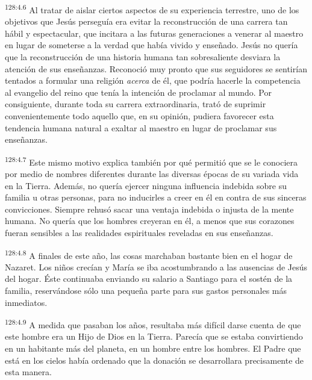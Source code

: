 \par
\textsuperscript{128:4.6} Al tratar de aislar ciertos aspectos de su experiencia terrestre, uno de los objetivos que Jesús perseguía era evitar la reconstrucción de una carrera tan hábil y espectacular, que incitara a las futuras generaciones a venerar al maestro en lugar de someterse a la verdad que había vivido y enseñado. Jesús no quería que la reconstrucción de una historia humana tan sobresaliente desviara la atención de sus enseñanzas. Reconoció muy pronto que sus seguidores se sentirían tentados a formular una religión \textit{acerca} de él, que podría hacerle la competencia al evangelio del reino que tenía la intención de proclamar al mundo. Por consiguiente, durante toda su carrera extraordinaria, trató de suprimir convenientemente todo aquello que, en su opinión, pudiera favorecer esta tendencia humana natural a exaltar al maestro en lugar de proclamar sus enseñanzas.

\par
\textsuperscript{128:4.7} Este mismo motivo explica también por qué permitió que se le conociera por medio de nombres diferentes durante las diversas épocas de su variada vida en la Tierra. Además, no quería ejercer ninguna influencia indebida sobre su familia u otras personas, para no inducirles a creer en él en contra de sus sinceras convicciones. Siempre rehusó sacar una ventaja indebida o injusta de la mente humana. No quería que los hombres creyeran en él, a menos que sus corazones fueran sensibles a las realidades espirituales reveladas en sus enseñanzas.

\par
\textsuperscript{128:4.8} A finales de este año, las cosas marchaban bastante bien en el hogar de Nazaret. Los niños crecían y María se iba acostumbrando a las ausencias de Jesús del hogar. Éste continuaba enviando su salario a Santiago para el sostén de la familia, reservándose sólo una pequeña parte para sus gastos personales más inmediatos.

\par
\textsuperscript{128:4.9} A medida que pasaban los años, resultaba más difícil darse cuenta de que este hombre era un Hijo de Dios en la Tierra. Parecía que se estaba convirtiendo en un habitante más del planeta, en un hombre entre los hombres. El Padre que está en los cielos había ordenado que la donación se desarrollara precisamente de esta manera.

